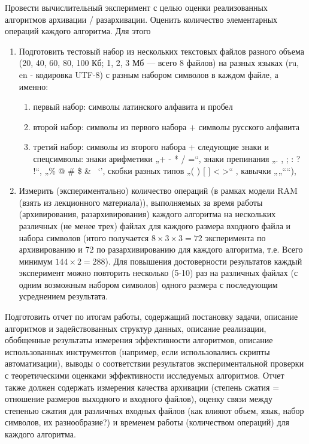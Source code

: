 \documentclass[a4paper, 12pt]{article}
\begin{document}
Провести вычислительный эксперимент с целью оценки реализованных
алгоритмов архивации / разархивации. Оценить количество элементарных операций
каждого алгоритма.
Для этого
\begin{enumerate}
  \item Подготовить тестовый набор из нескольких текстовых файлов разного объема
  (20, 40, 60, 80, 100 Кб; 1, 2, 3 Мб — всего 8 файлов) на разных языках (ru, en -
  кодировка UTF-8) с разным набором символов в каждом файле, а именно:
  \begin{enumerate}
    \item первый набор: символы латинского алфавита и пробел
    \item второй набор: символы из первого набора + символы русского алфавита
    \item третий набор: символы из второго набора + следующие знаки и
    спецсимволы: знаки арифметики „+ - * / =“, знаки препинания „. , ; : ? !“,
    „\% @ \# \$ & ~‘’, скобки разных типов „( ) [ ] { } < >“ , кавычки „„““),
  \end{enumerate}
  \item Измерить (экспериментально) количество операций (в рамках модели RAM (взять из
    лекционного материала)), выполняемых за время работы (архивирования,
    разархивирования) каждого алгоритма на нескольких различных (не менее
    трех) файлах для каждого размера входного файла и набора символов (итого
    получается $8\times3\times3 = 72$ эксперимента по архивированию и 72 по
    разархивированию для каждого алгоритма, т.е. Всего минимум $144\times2 = 288$).
    Для повышения достоверности результатов каждый эксперимент можно повторить несколько (5-10) раз на
    различных файлах (с одним возможным набором символов) одного размера с
    последующим усреднением результата.
\end{enumerate}

Подготовить отчет по итогам работы, содержащий постановку задачи, описание
алгоритмов и задействованных структур данных, описание реализации, обобщенные
результаты измерения эффективности алгоритмов, описание использованных
инструментов (например, если использовались скрипты автоматизации), выводы о
соответствии результатов экспериментальной проверки с теоретическими оценками
эффективности исследуемых алгоритмов.
Отчет также должен содержать измерения качества архивации (степень сжатия =
отношение размеров выходного и входного файлов), оценку связи между степенью
сжатия для различных входных файлов (как влияют объем, язык, набор символов, их
разнообразие?) и временем работы (количеством операций) для каждого алгоритма.
\end{document}
